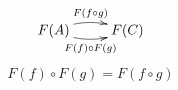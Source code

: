 \documentclass[11hpt]{article}
\begin{document}
\begin{equation} \label{eq:jquery-default}
  \xymatrix{ F(A) \ar@/^/[r]^{F(f \circ g)} \ar@/_/[r]_{F(f) \circ F(g)} & F(C) }
\end{equation}
\begin{equation} \label{eq:jquery-with-proxy}
  F(f) \circ F(g) = F(f \circ g)
\end{equation}
\end{document}
